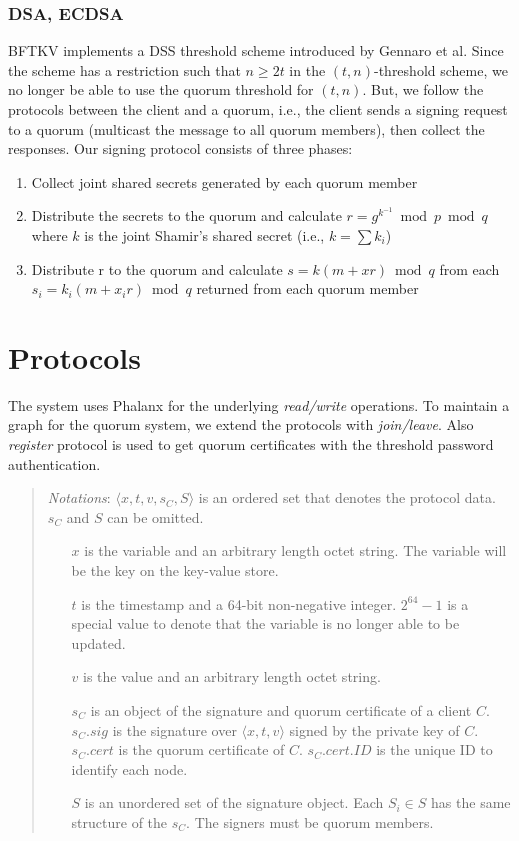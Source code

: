 \documentclass[twoside,twocolumn,10pt,fleqn]{article}
\begin{document}
\subsubsection*{DSA, ECDSA}
BFTKV implements a DSS threshold scheme introduced by Gennaro et
al. \cite{Gennaro}
Since the scheme has a restriction such that $n \geq 2t$ in the $(t,
n)$-threshold scheme, we no longer be able to use the quorum threshold
for $(t, n)$. But, we follow the protocols between the client and a
quorum, i.e., the client sends a signing request to a quorum
(multicast the message to all quorum members), then collect the
responses. Our signing protocol consists of three phases:
\begin{enumerate}
\item Collect joint shared secrets generated by each quorum member
\item Distribute the secrets to the quorum and calculate
  $r=g^{k^{-1}} \bmod p \bmod q$ where $k$ is the
  joint Shamir's shared secret (i.e., $k = \sum k_i$)
\item Distribute r to the quorum and calculate $s=k(m+xr) \bmod q$
  from each $s_i=k_i(m+x_ir) \bmod q$ returned from each quorum member
\end{enumerate}

\section{Protocols}

The system uses Phalanx \cite{Delhi:2} for the underlying {\em
read/write} operations. To maintain a graph for the quorum system, we
extend the protocols with {\em join/leave}. Also {\em register}
protocol is used to get quorum certificates with the threshold
password authentication.

\begin{quote}
  {\em Notations}:
  $\langle x, t, v, s_C, S \rangle$ is an ordered set that denotes the protocol
  data. $s_C$ and $S$ can be omitted.
  \begin{itemize}
  \item[$x$] is the variable and an arbitrary length octet string. The variable will
    be the key on the key-value store.
  \item[$t$] is the timestamp and a 64-bit non-negative integer. $2^{64}-1$ is
    a special value to denote that the variable is no longer able to be
    updated.
  \item[$v$] is the value and an arbitrary length octet string.
  \item[$s_C$] is an object of the signature and quorum certificate of a
    client $C$. $s_C.sig$ is the signature over $\langle x, t, v \rangle$ signed by the
    private key of $C$. $s_C.cert$ is the quorum certificate of
    $C$. $s_C.cert.ID$ is the unique ID to identify each node.
  \item[$S$] is an unordered set of the signature object. Each $S_i
    \in S$ has the
    same structure of the $s_C$. The signers must be quorum members.
  \end{itemize}
\end{quote}
\end{document}
